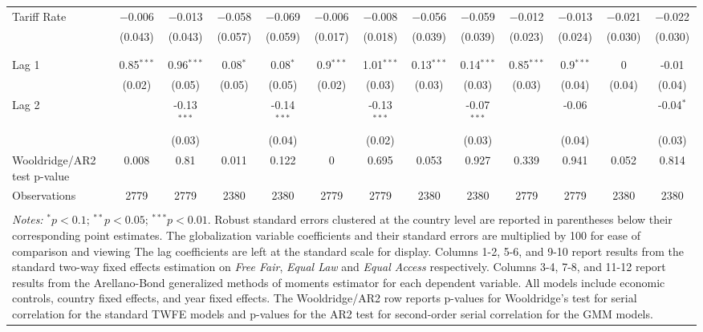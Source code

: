 \begin{table}
\begin{tabular}{@{\extracolsep{2pt}}lcccccccccccc}
 Tariff Rate & $-$0.006 & $-$0.013 & $-$0.058 & $-$0.069 & $-$0.006 & $-$0.008 & $-$0.056 & $-$0.059 & $-$0.012 & $-$0.013 & $-$0.021 & $-$0.022 \\ 
  & (0.043) & (0.043) & (0.057) & (0.059) & (0.017) & (0.018) & (0.039) & (0.039) & (0.023) & (0.024) & (0.030) & (0.030) \\ 
  & & & & & & & & & & & & \\ 
\hline \\[-1.8ex] 
Lag 1 & 0.85$^{***}$ & 0.96$^{***}$ & 0.08$^{*}$ & 0.08$^{*}$ & 0.9$^{***}$ & 1.01$^{***}$ & 0.13$^{***}$ & 0.14$^{***}$ & 0.85$^{***}$ & 0.9$^{***}$ & 0 & -0.01 \\ 
 & (0.02) & (0.05) & (0.05) & (0.05) & (0.02) & (0.03) & (0.03) & (0.03) & (0.03) & (0.04) & (0.04) & (0.04) \\ 
Lag 2 &  & -0.13$^{***}$ &  & -0.14$^{***}$ &  & -0.13$^{***}$ &  & -0.07$^{***}$ &  & -0.06 &  & -0.04$^{*}$ \\ 
 &  & (0.03) &  & (0.04) &  & (0.02) &  & (0.03) &  & (0.04) &  & (0.03) \\ 
Wooldridge/AR2 test p-value & 0.008 & 0.81 & 0.011 & 0.122 & 0 & 0.695 & 0.053 & 0.927 & 0.339 & 0.941 & 0.052 & 0.814 \\ 
Observations & 2779 & 2779 & 2380 & 2380 & 2779 & 2779 & 2380 & 2380 & 2779 & 2779 & 2380 & 2380 \\ 
\hline 
\hline \\[-1.8ex] 
\multicolumn{13}{l}{\parbox{1.2\linewidth}{\textit{Notes:} $^{*}p<0.1$; $^{**}
            p<0.05$; $^{***} p<0.01$. Robust standard errors clustered at the
            country level are reported in parentheses below their corresponding
            point estimates. The globalization variable coefficients and their
            standard errors are multiplied by 100 for ease of comparison and
            viewing The lag coefficients are left at the standard scale for
            display. Columns 1-2, 5-6, and 9-10 report results from the standard
            two-way fixed effects estimation on \textit{Free Fair},
            \textit{Equal Law} and \textit{Equal Access} respectively. Columns
            3-4, 7-8, and 11-12 report results from the Arellano-Bond
            generalized methods of moments estimator for each dependent
            variable. All models include economic controls, country fixed
            effects, and year fixed effects. The Wooldridge/AR2 row reports
            p-values for Wooldridge's test for serial correlation for the
            standard TWFE models and p-values for the AR2 test for second-order
            serial correlation for the GMM models.}} \\ 
\end{tabular} 
\end{table} 
